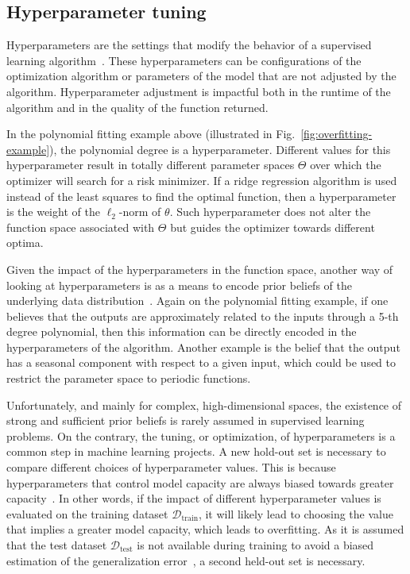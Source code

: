 \subsection{Hyperparameter tuning}

Hyperparameters are the settings that modify the behavior of a supervised learning algorithm~\cite{Goodfellow-et-al-2016}.
These hyperparameters can be configurations of the optimization algorithm or parameters of the model that are not adjusted by the algorithm.
Hyperparameter adjustment is impactful both in the runtime of the algorithm and in the quality of the function returned.

In the polynomial fitting example above (illustrated in Fig.~\ref{fig:overfitting-example}), the polynomial degree is a hyperparameter.
Different values for this hyperparameter result in totally different parameter spaces $\Theta$ over which the optimizer will search for a risk minimizer.
If a ridge regression algorithm is used instead of the least squares to find the optimal function, then a hyperparameter is the weight of the $\ell_2$-norm of $\theta$.
Such hyperparameter does not alter the function space associated with $\Theta$ but guides the optimizer towards different optima.

Given the impact of the hyperparameters in the function space, another way of looking at hyperparameters is as a means to encode prior beliefs of the underlying data distribution~\cite{murphyMachineLearningProbabilistic2013}.
Again on the polynomial fitting example, if one believes that the outputs are approximately related to the inputs through a 5-th degree polynomial, then this information can be directly encoded in the hyperparameters of the algorithm.
Another example is the belief that the output has a seasonal component with respect to a given input, which could be used to restrict the parameter space to periodic functions.

Unfortunately, and mainly for complex, high-dimensional spaces, the existence of strong and sufficient prior beliefs is rarely assumed in supervised learning problems.
On the contrary, the tuning, or optimization, of hyperparameters is a common step in machine learning projects.
A new hold-out set is necessary to compare different choices of hyperparameter values.
This is because hyperparameters that control model capacity are always biased towards greater capacity~\cite{Goodfellow-et-al-2016}.
In other words, if the impact of different hyperparameter values is evaluated on the training dataset $\mathcal{D}_\textrm{train}$, it will likely lead to choosing the value that implies a greater model capacity, which leads to overfitting.
As it is assumed that the test dataset $\mathcal{D}_\textrm{test}$ is not available during training to avoid a biased estimation of the generalization error~\cite{murphyMachineLearningProbabilistic2013}, a second held-out set is necessary.

